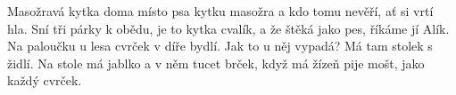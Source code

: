 \begin{TEXT}{Masožravá kytka}
\SLOKA {} doma místo psa kytku masožra\NL
a kdo tomu nevěří, ať si vrtí hla.\NL
Sní tři párky k obědu, je to kytka cvalík,\NL
a že štěká jako pes, říkáme jí Alík.
\SLOKA Na paloučku u lesa cvrček v díře bydlí.\NL
Jak to u něj vypadá? Má tam stolek s židlí.\NL
Na stole má jablko a v něm tucet brček,\NL
když má žízeň pije mošt, jako každý cvrček.
\end{TEXT}

